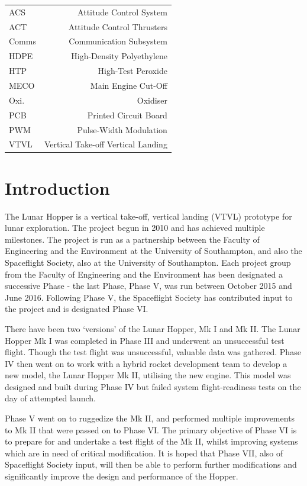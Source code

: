 \documentclass[12pt]{article}
\begin{document}
\begin{tabular}{l r}
ACS & Attitude Control System \\
ACT & Attitude Control Thrusters \\
Comms & Communication Subsystem \\
HDPE & High-Density Polyethylene \\
HTP & High-Test Peroxide \\
MECO & Main Engine Cut-Off \\
Oxi. & Oxidiser \\
PCB & Printed Circuit Board \\
PWM & Pulse-Width Modulation \\
VTVL & Vertical Take-off Vertical Landing \\
\end{tabular}

    \cleardoublepage

\tableofcontents
\cleardoublepage
\section{Introduction}
The Lunar Hopper is a vertical take-off, vertical landing (VTVL) prototype for lunar exploration. The project begun in 2010 and has achieved multiple milestones. The project is run as a partnership between the Faculty of Engineering and the Environment at the University of Southampton, and also the Spaceflight Society, also at the University of Southampton. Each project group from the Faculty of Engineering and the Environment has been designated a successive Phase - the last Phase, Phase V, was run between October 2015 and June 2016. Following Phase V, the Spaceflight Society has contributed input to the project and is designated Phase VI.

There have been two `versions' of the Lunar Hopper, Mk I and Mk II. The Lunar Hopper Mk I was completed in Phase III and underwent an unsuccessful test flight. Though the test flight was unsuccessful, valuable data was gathered. Phase IV then went on to work with a hybrid rocket development team to develop a new model, the Lunar Hopper Mk II, utilising the new engine. This model was designed and built during Phase IV but failed system flight-readiness tests on the day of attempted launch. 

Phase V went on to ruggedize the Mk II, and performed multiple improvements to Mk II that were passed on to Phase VI. The primary objective of Phase VI is to prepare for and undertake a test flight of the Mk II, whilst improving systems which are in need of critical modification. It is hoped that Phase VII, also of Spaceflight Society input, will then be able to perform further modifications and significantly improve the design and performance of the Hopper.
\end{document}
